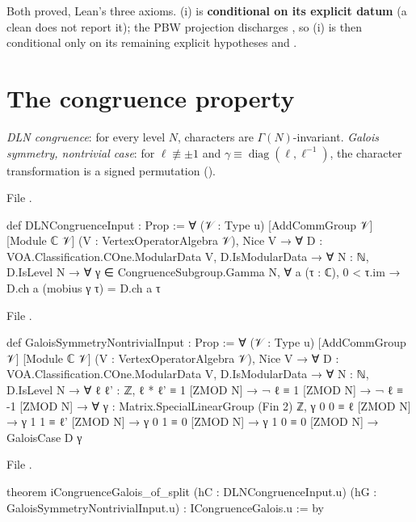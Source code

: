 \begin{status}
Both proved, Lean's three axioms. (i) is \textbf{conditional on its explicit datum}  (a clean
 does not report it); the PBW projection  discharges , so (i) is then conditional only on its
remaining explicit hypotheses  and .
\end{status}

\section{The congruence property}\label{l21:sec:congruence}

\begin{definition}\label{l21:def:split}
\emph{DLN congruence}: for every level $N$, characters are $\Gamma(N)$-invariant. \emph{Galois symmetry, nontrivial case}:
for $\ell\not\equiv\pm1$ and $\gamma\equiv\operatorname{diag}(\ell,\ell^{-1})$, the character transformation is a signed
permutation ().
\end{definition}
\noindent File .
\begin{leancode}
def DLNCongruenceInput : Prop :=
  ∀ (𝒱 : Type u) [AddCommGroup 𝒱] [Module ℂ 𝒱] (V : VertexOperatorAlgebra 𝒱), Nice V →
    ∀ D : VOA.Classification.COne.ModularData V, D.IsModularData → ∀ N : ℕ, D.IsLevel N →
      ∀ γ ∈ CongruenceSubgroup.Gamma N, ∀ a (τ : ℂ), 0 < τ.im →
        D.ch a (mobius γ τ) = D.ch a τ
\end{leancode}
\noindent File .
\begin{leancode}
def GaloisSymmetryNontrivialInput : Prop :=
  ∀ (𝒱 : Type u) [AddCommGroup 𝒱] [Module ℂ 𝒱] (V : VertexOperatorAlgebra 𝒱), Nice V →
    ∀ D : VOA.Classification.COne.ModularData V, D.IsModularData → ∀ N : ℕ, D.IsLevel N →
      ∀ ℓ ℓ' : ℤ, ℓ * ℓ' ≡ 1 [ZMOD N] → ¬ ℓ ≡ 1 [ZMOD N] → ¬ ℓ ≡ -1 [ZMOD N] →
      ∀ γ : Matrix.SpecialLinearGroup (Fin 2) ℤ,
        γ 0 0 ≡ ℓ [ZMOD N] → γ 1 1 ≡ ℓ' [ZMOD N] → γ 0 1 ≡ 0 [ZMOD N] → γ 1 0 ≡ 0 [ZMOD N] →
        GaloisCase D γ
\end{leancode}
\noindent File .
\begin{leancode}
theorem iCongruenceGalois_of_split (hC : DLNCongruenceInput.{u})
    (hG : GaloisSymmetryNontrivialInput.{u}) : ICongruenceGalois.{u} := by
\end{leancode}


